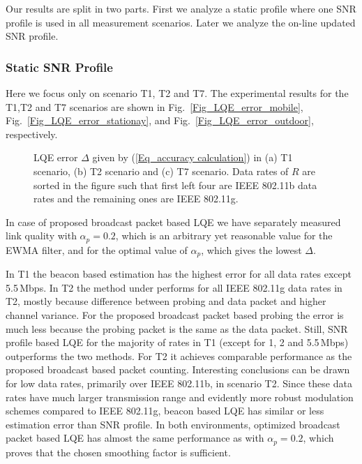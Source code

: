 \documentclass[11pt,draftclsnofoot,journal,onecolumn]{IEEEtran}
\begin{document}
Our results are split in two parts. First we analyze a static profile where one SNR profile is used in all measurement scenarios. Later we analyze the on-line updated SNR profile.

\subsubsection{Static SNR Profile}
\label{sec:result_static_profile}

Here we focus only on scenario T1, T2 and T7. The experimental
results for the T1,T2 and T7 scenarios are shown in
Fig.~\ref{Fig_LQE_error_mobile}, Fig.~\ref{Fig_LQE_error_stationay},
and Fig.~\ref{Fig_LQE_error_outdoor}, respectively.
\begin{figure}
\centering
{}
\caption{LQE error $\Delta$ given by (\ref{Eq_accuracy calculation}) in (a) T1 scenario, (b) T2 scenario and (c) T7 scenario. Data rates of $R$ are sorted in the figure such that first left four are IEEE 802.11b data rates and the remaining ones are IEEE 802.11g.}
\end{figure}


In case of proposed broadcast packet based LQE we have separately measured link quality with $\alpha_p=0.2$, which is an arbitrary yet reasonable value for the EWMA filter, and for the optimal value of $\alpha_p$, which gives the lowest $\Delta$.

In T1 the beacon based estimation has the highest error for all data rates except 5.5\,Mbps. In T2 the method under performs for all IEEE 802.11g data rates in T2, mostly because difference between probing and data packet and higher channel variance. For the proposed broadcast packet based probing the error is much less because the probing packet is the same as the data packet. Still, SNR profile based LQE for the majority of rates in T1 (except for 1, 2 and 5.5\,Mbps) outperforms the two methods. For T2 it achieves comparable performance as the proposed broadcast based packet counting. Interesting conclusions can be drawn for low data rates, primarily over IEEE 802.11b, in scenario T2. Since these data rates have much larger transmission range and evidently more robust modulation schemes compared to IEEE 802.11g, beacon based LQE has similar or less estimation error than SNR profile. In both environments, optimized broadcast packet based LQE has almost the same performance as with $\alpha_p=0.2$, which proves that the chosen smoothing factor is sufficient.
\end{document}

